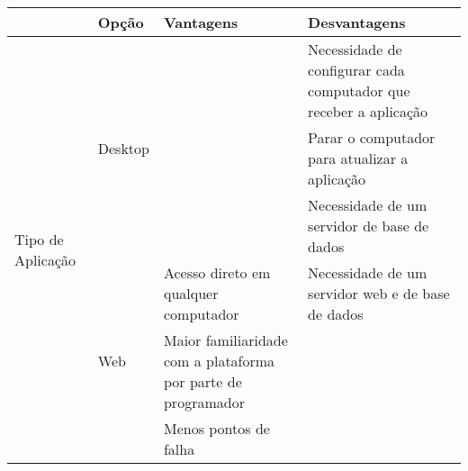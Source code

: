 \begin{longtable}{|p{}|p{}|p{}|p{}|}
	\hline
	& Opção                                                 & Vantagens                                                           & Desvantagens                                                                                        \\ \hline
	\multirow{6}{*}{Tipo de Aplicação}                                      & \multirow{3}{*}{Desktop}                              &                                                                     & Necessidade de configurar cada computador que receber a aplicação                                   \\
	&                                                       &                                                                     & Parar o computador para atualizar a aplicação                                                       \\
	&                                                       &                                                                     & Necessidade de um servidor de base de dados                                                         \\ \cline{2-4}
	& \multirow{3}{*}{Web}                                  & Acesso direto em qualquer computador                                & Necessidade de um servidor web e de base de dados                                                   \\
	&                                                       & Maior familiaridade com a plataforma por parte de programador       &                                                                                                     \\
	&                                                       & Menos pontos de falha                                               &                                                                                                     \\ \hline
	

\end{longtable}
